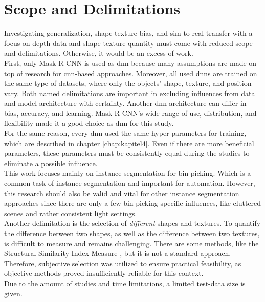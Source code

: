 	
	
	\section{Scope and Delimitations}
	\label{sec:scope-and-delimitations}
		Investigating generalization, shape-texture bias, and sim-to-real transfer with a focus on depth data and shape-texture quantity must come with reduced scope and delimitations. Otherwise, it would be an excess of work. \\
		First, only Mask R-CNN \cite{Kaiming2017} is used as \ac{dnn} because many assumptions are made on top of research for \ac{cnn}-based approaches.
		Moreover, all used \ac{dnn}s are trained on the same type of datasets, where only the objects' shape, texture, and position vary.
		Both named delimitations are important in excluding influences from data and model architecture with certainty. Another \ac{dnn} architecture can differ in bias, accuracy, and learning. Mask R-CNN's wide range of use, distribution, and flexibility made it a good choice as \ac{dnn} for this study.\\
		For the same reason, every \ac{dnn} used the same hyper-parameters for training, which are described in chapter \ref{chap:kapitel4}. Even if there are more beneficial parameters, these parameters must be consistently equal during the studies to eliminate a possible influence.\\
		This work focuses mainly on instance segmentation for bin-picking. Which is a common task of instance segmentation and important for automation\cite{Raj2023}\cite{Danielczuk2019}\cite{Xie2021}. However, this research should also be valid and vital for other instance segmentation approaches since there are only a few bin-picking-specific influences, like cluttered scenes and rather consistent light settings.\\
		Another delimitation is the selection of \textit{different} shapes and textures. To quantify the difference between two shapes, as well as the difference between two textures, is difficult to measure and remains challenging. There are some methods, like the Structural Similarity Index Measure \cite{Wang2004}, but it is not a standard approach. Therefore, subjective selection was utilized to ensure practical feasibility, as objective methods proved insufficiently reliable for this context.
		\\
		Due to the amount of studies and time limitations, a limited test-data size is given.\\
